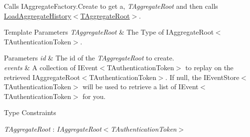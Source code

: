 Calls I\+Aggregate\+Factory.\+Create to get a, {\itshape T\+Aggregate\+Root}  and then calls \hyperlink{classCqrs_1_1Domain_1_1AggregateRepository_af26efcb464ac989962a9ad138466e4d7_af26efcb464ac989962a9ad138466e4d7}{Load\+Aggregate\+History$<$\+T\+Aggregate\+Root$>$}. 


\begin{DoxyTemplParams}{Template Parameters}
{\em T\+Aggregate\+Root} & The Type of I\+Aggregate\+Root$<$\+T\+Authentication\+Token$>$.\\
\hline
\end{DoxyTemplParams}

\begin{DoxyParams}{Parameters}
{\em id} & The id of the {\itshape T\+Aggregate\+Root}  to create.\\
\hline
{\em events} & A collection of I\+Event$<$\+T\+Authentication\+Token$>$ to replay on the retrieved I\+Aggregate\+Root$<$\+T\+Authentication\+Token$>$. If null, the I\+Event\+Store$<$\+T\+Authentication\+Token$>$ will be used to retrieve a list of I\+Event$<$\+T\+Authentication\+Token$>$ for you. \\
\hline
\end{DoxyParams}
\begin{Desc}
\item[Type Constraints]\begin{description}
\item[{\em T\+Aggregate\+Root} : {\em I\+Aggregate\+Root$<$T\+Authentication\+Token$>$}]\end{description}
\end{Desc}
\mbox{\label{classCqrs_1_1Domain_1_1AggregateRepository_af26efcb464ac989962a9ad138466e4d7_af26efcb464ac989962a9ad138466e4d7}} 
